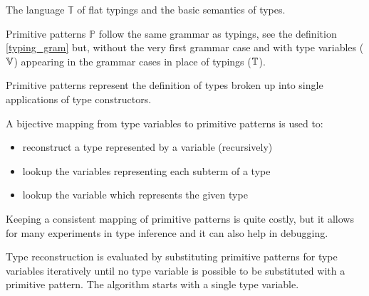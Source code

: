 \begin{lang}
  \def\grammarP{0.6}
  \begin{grammar}
  \end{grammar}
  \caption{The language $\mathbb{T}$ of flat typings and the basic semantics of types.}
  \label{lang:typing}
\end{lang}

\begin{defn}
    Primitive patterns $\mathbb{P}$ follow the same grammar as typings, see the definition \ref{typing_gram} but, without the very first grammar case and with type variables ($\mathbb{V}$) appearing in the grammar cases in place of typings ($\mathbb{T}$).

    Primitive patterns represent the definition of types broken up into single applications of type constructors.
\end{defn}

\begin{remark}
    A bijective mapping from type variables to primitive patterns is used to:

    \begin{itemize}
        \item reconstruct a type represented by a variable (recursively)
        \item lookup the variables representing each subterm of a type
        \item lookup the variable which represents the given type 
    \end{itemize}

    Keeping a consistent mapping of primitive patterns is quite costly, but it allows for many experiments in type inference and it can also help in debugging.
\end{remark}

\begin{defn}
    Type reconstruction is evaluated by substituting primitive patterns for type variables iteratively until no type variable is possible to be substituted with a primitive pattern. The algorithm starts with a single type variable.
\end{defn}

